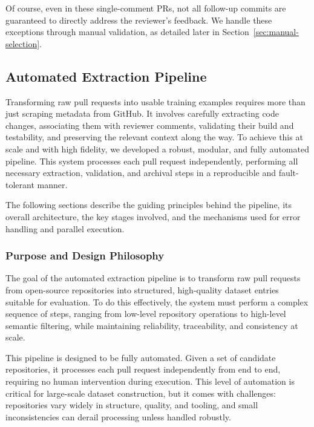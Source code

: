 Of course, even in these single-comment PRs, not all follow-up commits are guaranteed to directly
address the reviewer’s feedback. We handle these exceptions through manual validation, as detailed
later in Section~\ref{sec:manual-selection}.

\subsection{Automated Extraction Pipeline}
\label{sec:pipeline}
Transforming raw pull requests into usable training examples requires more than just scraping
metadata from GitHub. It involves carefully extracting code changes, associating them with reviewer
comments, validating their build and testability, and preserving the relevant context along the way.
To achieve this at scale and with high fidelity, we developed a robust, modular, and fully automated
pipeline. This system processes each pull request independently, performing all necessary
extraction, validation, and archival steps in a reproducible and fault-tolerant manner.

The following sections describe the guiding principles behind the pipeline, its overall
architecture, the key stages involved, and the mechanisms used for error handling and parallel
execution.

\subsubsection{Purpose and Design Philosophy}

The goal of the automated extraction pipeline is to transform raw pull requests from open-source
repositories into structured, high-quality dataset entries suitable for evaluation. To do this
effectively, the system must perform a complex sequence of steps, ranging from low-level repository
operations to high-level semantic filtering, while maintaining reliability, traceability, and
consistency at scale.

This pipeline is designed to be fully automated. Given a set of candidate repositories, it processes
each pull request independently from end to end, requiring no human intervention during execution.
This level of automation is critical for large-scale dataset construction, but it comes with
challenges: repositories vary widely in structure, quality, and tooling, and small inconsistencies
can derail processing unless handled robustly.

